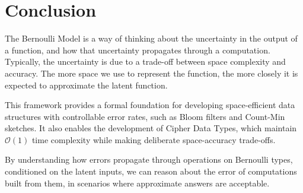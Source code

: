 \documentclass[../main.tex]{subfiles}
\begin{document}
\section{Conclusion}

The Bernoulli Model is a way of thinking about the uncertainty in the output of a function, and how that uncertainty propagates through a computation. Typically, the uncertainty is due to a trade-off between space complexity and accuracy. The more space we use to represent the function, the more closely it is expected to approximate the latent function.

This framework provides a formal foundation for developing space-efficient data structures with controllable error rates, such as Bloom filters and Count-Min sketches. It also enables the development of Cipher Data Types, which maintain $\mathcal{O}(1)$ time complexity while making deliberate space-accuracy trade-offs.

By understanding how errors propagate through operations on Bernoulli types, conditioned on the latent inputs, we can reason about the error of computations built from them, in scenarios where approximate answers are acceptable.
\end{document}
